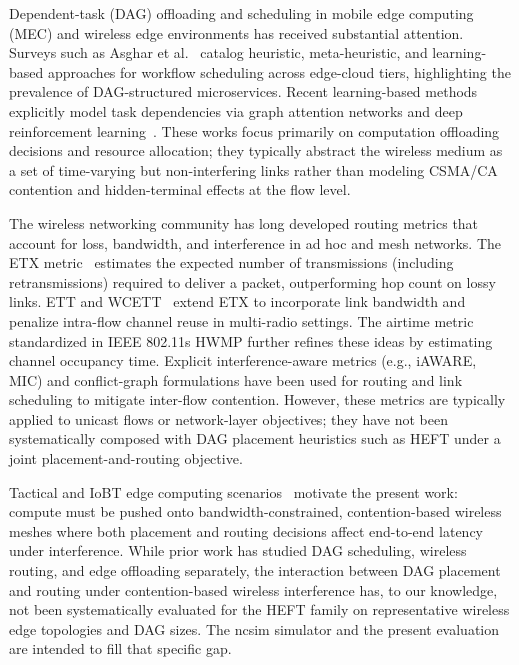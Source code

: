 \documentclass[conference]{IEEEtran}
\begin{document}
Dependent-task (DAG) offloading and scheduling in mobile edge computing
(MEC) and wireless edge environments has received substantial attention.
Surveys such as Asghar et al.~\cite{asghar2022survey} catalog heuristic,
meta-heuristic, and learning-based approaches for workflow scheduling
across edge-cloud tiers, highlighting the prevalence of DAG-structured
microservices. Recent learning-based methods explicitly model task
dependencies via graph attention networks and deep reinforcement
learning~\cite{cao2023dependent}.
These works focus primarily on computation offloading decisions and
resource allocation; they typically abstract the wireless medium as a
set of time-varying but non-interfering links rather than modeling
CSMA/CA contention and hidden-terminal effects at the flow level.

The wireless networking community has long developed routing metrics
that account for loss, bandwidth, and interference in ad hoc and mesh
networks. The ETX metric~\cite{decouto2003etx} estimates the expected
number of transmissions (including retransmissions) required to deliver
a packet, outperforming hop count on lossy links. ETT and WCETT~\cite{draves2004wcett}
extend ETX to incorporate link bandwidth and penalize intra-flow channel
reuse in multi-radio settings. The airtime metric standardized in IEEE
802.11s HWMP further refines these ideas by estimating channel occupancy
time. Explicit interference-aware metrics (e.g., iAWARE, MIC) and
conflict-graph formulations have been used for routing and link
scheduling to mitigate inter-flow contention. However, these metrics
are typically applied to unicast flows or network-layer objectives; they
have not been systematically composed with DAG placement heuristics such
as HEFT under a joint placement-and-routing objective.

Tactical and IoBT edge computing scenarios~\cite{kott2016iobt} motivate
the present work: compute must be pushed onto bandwidth-constrained,
contention-based wireless meshes where both placement and routing
decisions affect end-to-end latency under interference. While prior work
has studied DAG scheduling, wireless routing, and edge offloading
separately, the interaction between DAG placement and routing under
contention-based wireless interference has, to our knowledge, not been
systematically evaluated for the HEFT family on representative wireless
edge topologies and DAG sizes. The ncsim simulator and the present
evaluation are intended to fill that specific gap.

\end{document}
